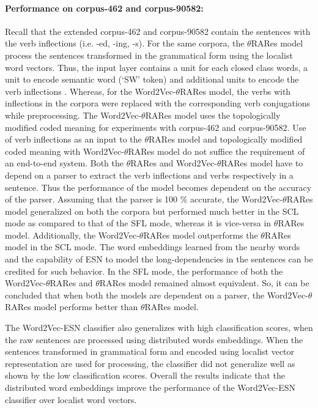 \paragraph{Performance on corpus-462 and corpus-90582:} Recall that the extended corpus-462 and corpus-90582 contain the sentences with the verb inflections (i.e. -ed, -ing, -s). For the same corpora, the $\theta$RARes model process the sentences transformed in the grammatical form using the localist word vectors. Thus, the input layer contains a unit for each closed class words, a unit to encode semantic word (`SW' token) and additional units to encode the verb inflections \cite{xavier:2013:RT}. Whereas, for the Word2Vec-$\theta$RARes model, the verbs with inflections in the corpora were replaced with the corresponding verb conjugations while preprocessing. The Word2Vec-$\theta$RARes model uses the topologically modified coded meaning for experiments with corpus-462 and corpus-90582. Use of verb inflections as an input to the $\theta$RARes model and topologically modified coded meaning with Word2Vec-$\theta$RARes model do not suffice the requirement of an end-to-end system. Both the $\theta$RARes and Word2Vec-$\theta$RARes model have to depend on a parser to extract the verb inflections and verbs respectively in a sentence. Thus the performance of the model becomes dependent on the accuracy of the parser. Assuming that the parser is 100 $\%$ accurate, the Word2Vec-$\theta$RARes model generalized on both the corpora but performed much better in the SCL mode as compared to that of the SFL mode, whereas it is vice-versa in $\theta$RARes model. Additionally, the Word2Vec-$\theta$RARes model outperforms the $\theta$RARes model in the SCL mode. The word embeddings learned from the nearby words and the capability of ESN to model the long-dependencies in the sentences can be credited for such behavior. In the SFL mode, the performance of both the Word2Vec-$\theta$RARes and $\theta$RARes model remained almost equivalent. So, it can be concluded that when both the models are dependent on a parser, the Word2Vec-$\theta$RARes model performs better than $\theta$RARes model.

The Word2Vec-ESN classifier also generalizes with high classification scores, when the raw sentences are processed using distributed words embeddings. When the sentences transformed in grammatical form and encoded using localist vector representation are used for processing, the classifier did not generalize well as shown by the low classification scores. Overall the results indicate that the distributed word embeddings improve the performance of the Word2Vec-ESN classifier over localist word vectors.

